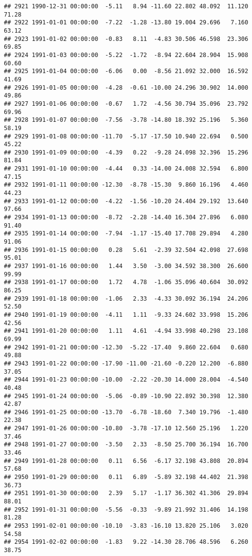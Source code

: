 \documentclass{article}\usepackage{graphicx, color}
\makeatletter
\newenvironment{kframe}{%
 \def\at@end@of@kframe{}%
 \ifinner\ifhmode%
  \def\at@end@of@kframe{\end{minipage}}%
  \begin{minipage}{\columnwidth}%
 \fi\fi%
 \def\FrameCommand##1{\hskip\@totalleftmargin \hskip-\fboxsep
 \colorbox{shadecolor}{##1}\hskip-\fboxsep
     \hskip-\linewidth \hskip-\@totalleftmargin \hskip\columnwidth}%
 \MakeFramed {\advance\hsize-\width
   \@totalleftmargin\z@ \linewidth\hsize
   \@setminipage}}%
 {\par\unskip\endMakeFramed%
 \at@end@of@kframe}
\newenvironment{knitrout}{}{} %
\makeatother
\begin{document}
\begin{knitrout}
\begin{kframe}
\begin{verbatim}
## 2921 1990-12-31 00:00:00  -5.11   8.94 -11.60 22.802 48.092  11.120  71.28
## 2922 1991-01-01 00:00:00  -7.22  -1.28 -13.80 19.004 29.696   7.160  63.12
## 2923 1991-01-02 00:00:00  -0.83   8.11  -4.83 30.506 46.598  23.306  69.85
## 2924 1991-01-03 00:00:00  -5.22  -1.72  -8.94 22.604 28.904  15.908  60.60
## 2925 1991-01-04 00:00:00  -6.06   0.00  -8.56 21.092 32.000  16.592  41.69
## 2926 1991-01-05 00:00:00  -4.28  -0.61 -10.00 24.296 30.902  14.000  49.86
## 2927 1991-01-06 00:00:00  -0.67   1.72  -4.56 30.794 35.096  23.792  69.96
## 2928 1991-01-07 00:00:00  -7.56  -3.78 -14.80 18.392 25.196   5.360  58.19
## 2929 1991-01-08 00:00:00 -11.70  -5.17 -17.50 10.940 22.694   0.500  45.22
## 2930 1991-01-09 00:00:00  -4.39   0.22  -9.28 24.098 32.396  15.296  81.84
## 2931 1991-01-10 00:00:00  -4.44   0.33 -14.00 24.008 32.594   6.800  47.15
## 2932 1991-01-11 00:00:00 -12.30  -8.78 -15.30  9.860 16.196   4.460  44.23
## 2933 1991-01-12 00:00:00  -4.22  -1.56 -10.20 24.404 29.192  13.640  97.66
## 2934 1991-01-13 00:00:00  -8.72  -2.28 -14.40 16.304 27.896   6.080  91.40
## 2935 1991-01-14 00:00:00  -7.94  -1.17 -15.40 17.708 29.894   4.280  91.06
## 2936 1991-01-15 00:00:00   0.28   5.61  -2.39 32.504 42.098  27.698  95.01
## 2937 1991-01-16 00:00:00   1.44   3.50  -3.00 34.592 38.300  26.600  99.99
## 2938 1991-01-17 00:00:00   1.72   4.78  -1.06 35.096 40.604  30.092  86.25
## 2939 1991-01-18 00:00:00  -1.06   2.33  -4.33 30.092 36.194  24.206  52.50
## 2940 1991-01-19 00:00:00  -4.11   1.11  -9.33 24.602 33.998  15.206  42.56
## 2941 1991-01-20 00:00:00   1.11   4.61  -4.94 33.998 40.298  23.108  69.99
## 2942 1991-01-21 00:00:00 -12.30  -5.22 -17.40  9.860 22.604   0.680  49.88
## 2943 1991-01-22 00:00:00 -17.90 -11.00 -21.60 -0.220 12.200  -6.880  37.05
## 2944 1991-01-23 00:00:00 -10.00  -2.22 -20.30 14.000 28.004  -4.540  40.48
## 2945 1991-01-24 00:00:00  -5.06  -0.89 -10.90 22.892 30.398  12.380  42.87
## 2946 1991-01-25 00:00:00 -13.70  -6.78 -18.60  7.340 19.796  -1.480  22.38
## 2947 1991-01-26 00:00:00 -10.80  -3.78 -17.10 12.560 25.196   1.220  37.46
## 2948 1991-01-27 00:00:00  -3.50   2.33  -8.50 25.700 36.194  16.700  33.46
## 2949 1991-01-28 00:00:00   0.11   6.56  -6.17 32.198 43.808  20.894  57.68
## 2950 1991-01-29 00:00:00   0.11   6.89  -5.89 32.198 44.402  21.398  36.73
## 2951 1991-01-30 00:00:00   2.39   5.17  -1.17 36.302 41.306  29.894  88.01
## 2952 1991-01-31 00:00:00  -5.56  -0.33  -9.89 21.992 31.406  14.198  81.28
## 2953 1991-02-01 00:00:00 -10.10  -3.83 -16.10 13.820 25.106   3.020  54.58
## 2954 1991-02-02 00:00:00  -1.83   9.22 -14.30 28.706 48.596   6.260  38.75

\end{verbatim}
\end{kframe}
\end{knitrout}
\end{document}
